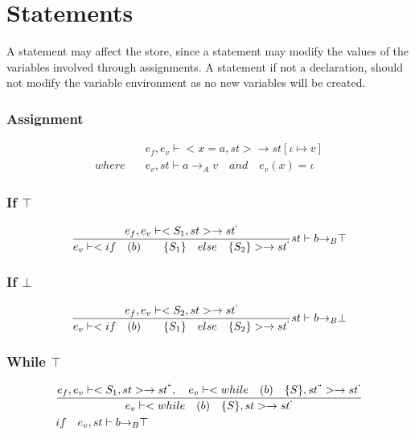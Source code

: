 \section*{Statements}
A statement may affect the store, since a statement may modify the values of the variables involved through assignments.
A statement if not a declaration, should not modify the variable environment as no new variables will be created.

\subsubsection{Assignment}
\begin{align*}
	&{ e }_{ f },{ e }_{ v }\vdash <x=a,st>\rightarrow st[\iota \mapsto v]\\
	where\quad &{ e }_{ v },st\vdash a{ \rightarrow  }_{ A }v\quad and\quad  { e }_{ v }(x)=\iota 
\end{align*}

\subsubsection{If $\top$}
\begin{equation}
	\frac { { e }_{ f },{ e }_{ v }\vdash <{ S }_{ 1 },st>\rightarrow { st }^{ ` } }{ { e }_{ v }\vdash <if\quad (b)\quad \quad \{{ S }_{ 1 }\}\quad else \quad \{{ S }_{ 2 }\}>\rightarrow { st }^{ ` } } st\vdash b{ \rightarrow  }_{ B }\top 
\end{equation}

\subsubsection{If $\bot$}
\begin{equation}
	\frac { { e }_{ f },{ e }_{ v }\vdash <{ S }_{ 2 },st>\rightarrow { st }^{ ` } }{ { e }_{ v }\vdash <if\quad (b)\quad \quad \{{ S }_{ 1 }\}\quad else \quad \{{ S }_{ 2 }\}>\rightarrow { st }^{ ` } } st\vdash b{ \rightarrow  }_{ B }\bot 
\end{equation}

\subsubsection{While $\top$}
\begin{align*}
	&\frac { { e }_{ f },{ e }_{ v }\vdash <{ S }_{ 1 },st>\rightarrow { st }^{ `` },\quad { e }_{ v }\vdash <while\quad (b)\quad \{S\},{ st }^{ `` }>\rightarrow { st }^{ ` } }{ { e }_{ v }\vdash <while\quad (b)\quad \{S\},st>\rightarrow { st }^{ ` } }\\
	&if\quad { e }_{ v },st\vdash b{ \rightarrow  }_{ B }\top 
\end{align*}


